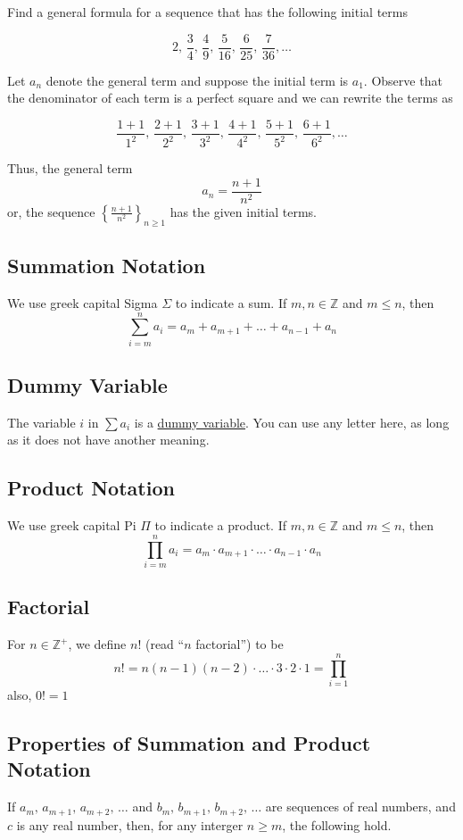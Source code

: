 \begin{example}
    Find a general formula for a sequence that has the following initial terms

    $$2,\, \frac34,\, \frac49,\, \frac{5}{16},\, \frac{6}{25},\, \frac{7}{36},\dots$$

    Let $a_n$ denote the general term and suppose the initial term is $a_1$. Observe that the denominator of each term is a perfect square and we can rewrite the terms as

    $$\frac{1+1}{1^2},\, \frac{2+1}{2^2},\, \frac{3+1}{3^2},\, \frac{4+1}{4^2},\, \frac{5+1}{5^2},\, \frac{6+1}{6^2},\dots$$

    Thus, the general term $$a_n = \frac{n+1}{n^2}$$ or, the sequence $\left\{\frac{n+1}{n^2}\right\}_{n\geq 1}$ has the given initial terms.
\end{example}

\subsection{Summation Notation}
We use greek capital Sigma $\Sigma$ to indicate a sum. If $m,n\in\mathbb Z$ and $m\leq n$, then $$\sum_{i=m}^n a_i = a_m + a_{m+1} + \dots + a_{n-1} + a_n$$

\subsection{Dummy Variable}
\begin{example}
    The variable $i$ in $\sum a_i$ is a \underline{dummy variable}. You can use any letter here, as long as it does not have another meaning.
\end{example}

\subsection{Product Notation}
We use greek capital Pi $\Pi$ to indicate a product. If $m,n\in\mathbb Z$ and $m\leq n$, then $$\prod_{i=m}^n a_i = a_m\cdot a_{m+1}\cdot\dots\cdot a_{n-1}\cdot a_n$$

\subsection{Factorial}
For $n\in\mathbb Z^+$, we define $n!$ (read ``$n$ factorial'') to be $$n! = n(n-1)(n-2)\cdot\dots\cdot 3\cdot 2\cdot 1 = \prod_{i=1}^n$$ also, $0!=1$

\subsection{Properties of Summation and Product Notation}
If $a_m,\, a_{m+1},\, a_{m+2},\,\dots$ and $b_m,\, b_{m+1},\, b_{m+2},\,\dots$ are sequences of real numbers, and $c$ is any real number, then, for any interger $n\geq m$, the following hold.

